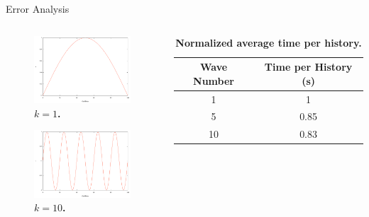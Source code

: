 \documentclass{beamer}
\begin{document}
\begin{frame}{Error Analysis}

  \begin{columns}

    \begin{column}{0.3\textwidth}

      \begin{figure}[h!]
        \includegraphics[width=1.5in]{mode_1.pdf}
        \caption{\textbf{$k = 1$.}}
      \end{figure}
      
     \vspace{-0.5in}

      \begin{figure}[b]
        \includegraphics[width=1.5in]{mode_10.pdf}
        \caption{\textbf{$k = 10$.}}
      \end{figure}

    \end{column}

    \begin{column}{0.7\textwidth}

      \vspace{-0.25in}

      { \tiny
        \begin{table}[h!]
          \begin{center}
            \begin{tabular}{cc}\hline\hline
              \multicolumn{1}{c}{\textbf{Wave Number}} & 
              \multicolumn{1}{c}{\textbf{Time per History (s)}} \\
              \hline
              1 & 1 \\
              5 & 0.85 \\
              10 & 0.83 \\
              \hline\hline
            \end{tabular}
          \end{center}
          \caption{\textbf{Normalized average time per history.}}
          \label{tab:mc_timing}
        \end{table}
      }


\end{column}
\end{columns}
\end{frame}
\end{document}
